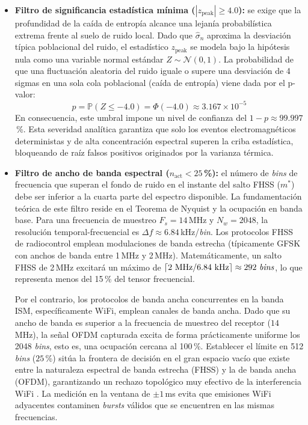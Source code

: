 \begin{itemize}\itemsep 0em
    \item \textbf{Filtro de significancia estadística mínima ($|z_{\text{peak}}| \ge 4.0$):} se exige que la profundidad de la caída de entropía alcance una lejanía probabilística extrema frente al suelo de ruido local. Dado que $\hat{\sigma}_n$ aproxima la desviación típica poblacional del ruido, el estadístico $z_{\text{peak}}$ se modela bajo la hipótesis nula como una variable normal estándar $Z \sim \mathcal{N}(0, 1)$. La probabilidad de que una fluctuación aleatoria del ruido iguale o supere una desviación de 4 sigmas en una sola cola poblacional (caída de entropía) viene dada por el p-valor:
    \begin{equation}
        p = \mathbb{P}(Z \le -4.0) = \Phi(-4.0) \approx 3.167 \times 10^{-5}
    \end{equation}
    En consecuencia, este umbral impone un nivel de confianza del $1 - p \approx 99.997$\,\%. Esta severidad analítica garantiza que solo los eventos electromagnéticos deterministas y de alta concentración espectral superen la criba estadística, bloqueando de raíz falsos positivos originados por la varianza térmica.

    \item \textbf{Filtro de ancho de banda espectral ($n_{\text{act}} < 25$\,\%):} el número de \textit{bins} de frecuencia que superan el fondo de ruido en el instante del salto FHSS ($m^*$) debe ser inferior a la cuarta parte del espectro disponible. La fundamentación teórica de este filtro reside en el Teorema de Nyquist y la ocupación en banda base. Para una frecuencia de muestreo $F_s = 14$\,MHz y $N_w = 2048$, la resolución temporal-frecuencial es $\Delta f \approx 6.84$\,kHz/\textit{bin}. Los protocolos FHSS de radiocontrol emplean modulaciones de banda estrecha (típicamente GFSK con anchos de banda entre 1\,MHz y 2\,MHz). Matemáticamente, un salto FHSS de 2\,MHz excitará un máximo de $\lceil 2\text{ MHz} / 6.84\text{ kHz} \rceil \approx 292 \text{ \textit{bins}}$, lo que representa menos del 15\,\% del tensor frecuencial.

    Por el contrario, los protocolos de banda ancha concurrentes en la banda ISM, específicamente WiFi, emplean canales de banda ancha. Dado que su ancho de banda es superior a la frecuencia de muestreo del receptor ($14$\,MHz), la señal OFDM capturada excita de forma prácticamente uniforme los 2048 \textit{bins}, esto es, una ocupación cercana al 100\,\%. Establecer el límite en 512 \textit{bins} ($25$\,\%) sitúa la frontera de decisión en el gran espacio vacío que existe entre la naturaleza espectral de banda estrecha (FHSS) y la de banda ancha (OFDM), garantizando un rechazo topológico muy efectivo de la interferencia WiFi \cite{miller_service_2007}. La medición en la ventana de $\pm 1$\,ms evita que emisiones WiFi adyacentes contaminen \textit{bursts} válidos que se encuentren en las mismas frecuencias.
\end{itemize}

